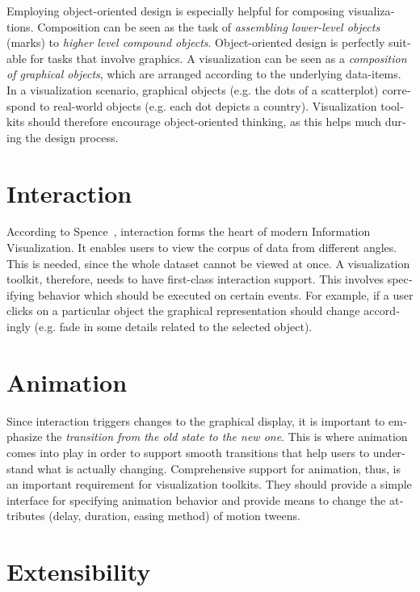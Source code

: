 \begin{english}
Employing object-oriented design is especially helpful for composing visualizations. Composition can be seen as the task of \emph{assembling  lower-level objects} (marks) to \emph{higher level compound objects}. Object-oriented design is perfectly suitable for tasks that involve graphics. A visualization can be seen as a \emph{composition of graphical objects}, which are arranged according to the underlying data-items. In a visualization scenario, graphical objects (e.g. the dots of a scatterplot) correspond to real-world objects (e.g. each dot depicts a country). Visualization toolkits should therefore encourage object-oriented thinking, as this helps much during the design process.


\section{Interaction}

According to Spence~\cite{InformationVisualization07}, interaction forms the heart of modern Information Visualization. It enables users to view the corpus of data from different angles. This is needed, since the whole dataset cannot be viewed at once. A visualization toolkit, therefore, needs to have first-class interaction support. This involves specifying behavior which should be executed on certain events. For example, if a user clicks on a particular object the graphical representation should change accordingly (e.g. fade in some details related to the selected object).

\section{Animation}

Since interaction triggers changes to the graphical display, it is important to emphasize the \emph{transition from the old state to the new one}. This is where animation comes into play in order to support smooth transitions that help users to understand what is actually changing. Comprehensive support for animation, thus, is an important requirement for visualization toolkits. They should provide a simple interface for specifying animation behavior and provide means to change the attributes (delay, duration, easing method) of motion tweens.


\section{Extensibility}


\end{english}
